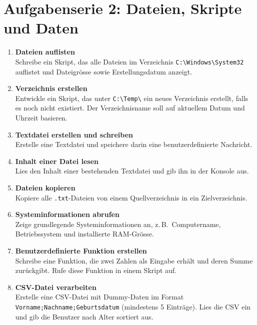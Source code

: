 \documentclass[11pt, oneside, numbers=noenddot]{scrbook}
\begin{document}
\chapter{Aufgabenserie 2: Dateien, Skripte und Daten}
\begin{enumerate}
\item \textbf{Dateien auflisten}\\
Schreibe ein Skript, das alle Dateien im Verzeichnis \texttt{C:\textbackslash Windows\textbackslash System32} auflistet und Dateigrösse sowie Erstellungsdatum anzeigt.

\item \textbf{Verzeichnis erstellen}\\
Entwickle ein Skript, das unter \texttt{C:\textbackslash Temp\textbackslash} ein neues Verzeichnis erstellt, falls es noch nicht existiert. Der Verzeichnisname soll auf aktuellem Datum und Uhrzeit basieren.

\item \textbf{Textdatei erstellen und schreiben}\\
Erstelle eine Textdatei und speichere darin eine benutzerdefinierte Nachricht.

\item \textbf{Inhalt einer Datei lesen}\\
Lies den Inhalt einer bestehenden Textdatei und gib ihn in der Konsole aus.

\item \textbf{Dateien kopieren}\\
Kopiere alle \texttt{.txt}-Dateien von einem Quellverzeichnis in ein Zielverzeichnis.

\item \textbf{Systeminformationen abrufen}\\
Zeige grundlegende Systeminformationen an, z.\,B.\ Computername, Betriebssystem und installierte RAM-Grösse.

\item \textbf{Benutzerdefinierte Funktion erstellen}\\
Schreibe eine Funktion, die zwei Zahlen als Eingabe erhält und deren Summe zurückgibt. Rufe diese Funktion in einem Skript auf.

\item \textbf{CSV-Datei verarbeiten}\\
Erstelle eine CSV-Datei mit Dummy-Daten im Format \texttt{Vorname;Nachname;Geburtsdatum} (mindestens 5 Einträge). Lies die CSV ein und gib die Benutzer nach Alter sortiert aus.
\end{enumerate}
\end{document}
